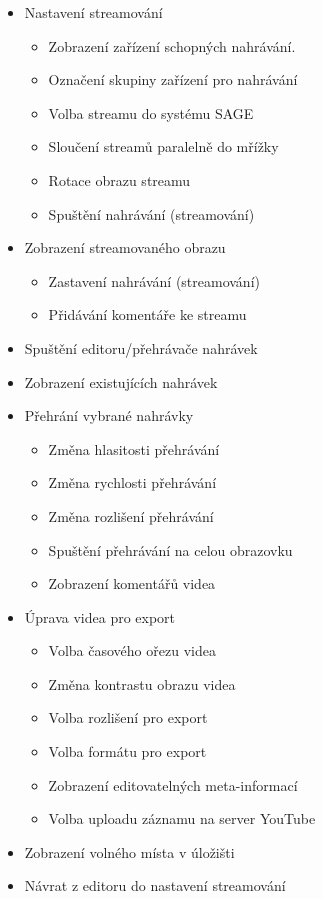 \documentclass[thesis=M,czech]{FITthesis}[2012/06/26]
\begin{document}
\begin{itemize}
 \item Nastavení streamování
   \begin{itemize}
	 \item Zobrazení zařízení schopných nahrávání.
	 \item Označení skupiny zařízení pro nahrávání
	 \item Volba streamu do systému SAGE
	 \item Sloučení streamů paralelně do mřížky
	 \item Rotace obrazu streamu
	 \item Spuštění nahrávání (streamování)
   \end{itemize}
 \item Zobrazení streamovaného obrazu
   \begin{itemize}
	 \item Zastavení nahrávání (streamování)
 	 \item Přidávání komentáře ke streamu
   \end{itemize}
 \item Spuštění editoru/přehrávače nahrávek
 \item Zobrazení existujících nahrávek
 \item Přehrání vybrané nahrávky
   \begin{itemize}
 	 \item Změna hlasitosti přehrávání
	 \item Změna rychlosti přehrávání
	 \item Změna rozlišení přehrávání
 	 \item Spuštění přehrávání na celou obrazovku
 	 \item Zobrazení komentářů videa
   \end{itemize}
 \item Úprava videa pro export
   \begin{itemize}
	 \item Volba časového ořezu videa 
     \item Změna kontrastu obrazu videa
  	 \item Volba rozlišení pro export
  	 \item Volba formátu pro export
	 \item Zobrazení editovatelných meta-informací
	 \item Volba uploadu záznamu na server YouTube
   \end{itemize}
 \item Zobrazení volného místa v úložišti
 \item Návrat z editoru do nastavení streamování
\end{itemize}
\end{document}
